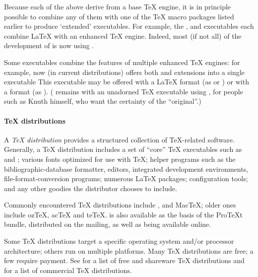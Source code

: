 Because each of the above derive from a base \TeX{} engine, it is in
principle possible to combine any of them with one of the \TeX{} macro
packages listed earlier to produce `extended' executables.  For
example, the ,  and
 executables each combine \LaTeX{} with an enhanced
\TeX{} engine.  Indeed, most (if not all) of the development of
\context{} is now using \LuaTeX{}.

Some executables combine the features of multiple enhanced \TeX{}
engines: for example,  now (in current distributions)
offers both \PDFTeX{} and \eTeX{} extensions into a single executable
This executable may be offered with a \LaTeX{} format (as
 or ) or with a \plaintex{} format
(as ).  ( remains with an unadorned
\TeX{} executable using \plaintex{}, for people such as Knuth himself,
who want the certainty of the ``original''.)

\paragraph{\TeX{} distributions}
A \emph{\TeX{} distribution} provides a structured collection of
\TeX{}-related software.  Generally, a \TeX{} distribution includes a
set of ``core'' \TeX{} executables such as  and
; various fonts optimized for use with \TeX{}; helper
programs such as the \BibTeX{} bibliographic-database formatter,
editors, integrated development environments, file-format-conversion
programs; numerous \LaTeX{} packages; configuration tools; and any
other goodies the distributor chooses to include.

Commonly encountered \TeX{} distributions include \texlive{},
\miktex{} and Mac\TeX{}; older ones include oz\TeX{},
ac\TeX{} and te\TeX{}.  \miktex{} is also available as the
basis of the Pro\TeX{}t bundle, distributed on the \texlive{}
 mailing, as well as being available online.

Some \TeX{} distributions target a specific operating system and/or
processor architecture; others run on multiple platforms.  Many \TeX{}
distributions are free; a few require payment.  See %
 for a
list of free and shareware \TeX{} distributions and %
 for a
list of commercial \TeX{} distributions.

